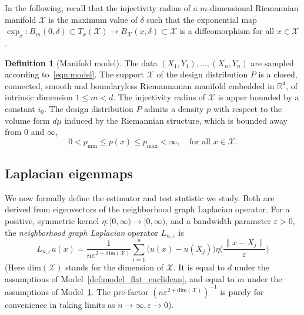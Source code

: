\documentclass{article}
\newcommand{\Reals}{\mathbb{R}}
\newcommand{\1}{\mathbf{1}}
\newcommand{\Rd}{\Reals^d}
\newcommand{\mc}[1]{\mathcal{#1}}
\theoremstyle{alden}
\theoremstyle{aldenthm}
\theoremstyle{definition}
\newtheorem{definition}{Definition}[section]
\theoremstyle{remark}
\begin{document}
In the following, recall that the injectivity radius of a $m$-dimensional Riemannian manifold $\mc{X}$ is the maximum value of $\delta$ such that the exponential map $\exp_x: B_m(0,\delta) \subset T_x(\mc{X}) \to B_{\mc{X}}(x,\delta) \subset \mc{X}$ is a diffeomorphism for all $x \in \mc{X}$.
\begin{definition}[Manifold model]
	\label{def:model_manifold}
	The data $(X_1,Y_1),\ldots,(X_n,Y_n)$ are sampled according to~\eqref{eqn:model}. 
	The support $\mc{X}$ of the design distribution $P$ is a closed, connected, smooth and boundaryless Riemannanian manifold embedded in $\Rd$, of intrinsic dimension $1 \leq m < d$. The injectivity radius of $\mc{X}$ is upper bounded by a constant $i_0$. The design distribution $P$ admits a density $p$ with respect to the volume form $d\mu$ induced by the Riemannian structure, which is bounded away from $0$ and $\infty$,
	\begin{equation*}
	0 < p_{\min} \leq p(x) \leq p_{\max} < \infty, \quad \textrm{for all $x \in \mc{X}$.}
	\end{equation*}
\end{definition}

\subsection{Laplacian eigenmaps}
We now formally define the estimator and test statistic we study. Both are derived from eigenvectors of the neighborhood graph Laplacian operator. For a positive, symmetric kernel $\eta: [0,\infty) \to [0,\infty)$, and a bandwidth parameter $\varepsilon > 0$, the \emph{neighborhood graph Laplacian} operator $L_{n,\varepsilon}$ is
\begin{equation}
\label{eqn:neighborhood_graph_laplacian}
L_{n,\varepsilon}u(x) = \frac{1}{n\varepsilon^{2 + \mathrm{dim}(\mc{X})}} \sum_{i = 1}^{n} \bigl(u(x) - u(X_j)\bigr) \eta\biggl(\frac{\|x - X_j\|}{\varepsilon}\biggr)
\end{equation}
(Here $\mathrm{dim}(\mc{X})$ stands for the dimension of $\mc{X}$. It is equal to $d$ under the assumptions of Model~\ref{def:model_flat_euclidean}, and equal to $m$ under the assumptions of Model~\ref{def:model_manifold}. The pre-factor $(n\varepsilon^{2 + \mathrm{dim}(\mc{X})})^{-1}$ is purely for convenience in taking limits as $n \to \infty, \varepsilon \to 0$). 
\end{document}
